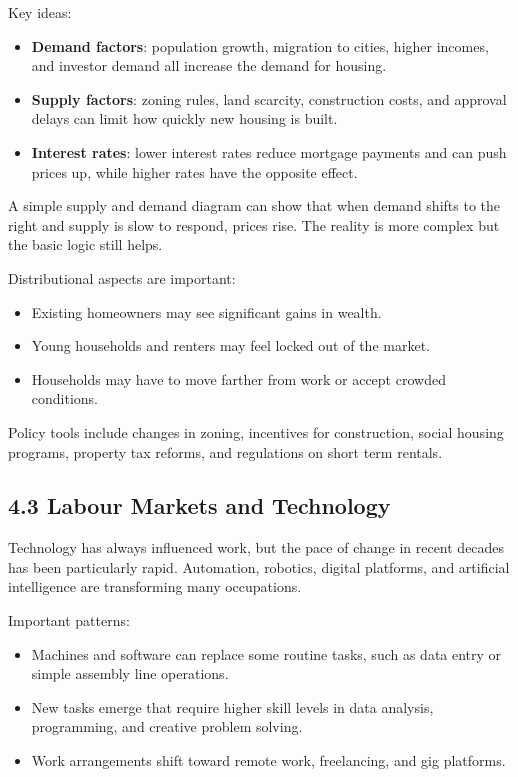 \documentclass[12pt]{article}
\begin{document}
Key ideas:

\begin{itemize}[noitemsep]
    \item \textbf{Demand factors}: population growth, migration to cities, higher incomes, and investor demand all increase the demand for housing.
    \item \textbf{Supply factors}: zoning rules, land scarcity, construction costs, and approval delays can limit how quickly new housing is built.
    \item \textbf{Interest rates}: lower interest rates reduce mortgage payments and can push prices up, while higher rates have the opposite effect.
\end{itemize}

A simple supply and demand diagram can show that when demand shifts to the right and supply is slow to respond, prices rise. The reality is more complex but the basic logic still helps.

Distributional aspects are important:

\begin{itemize}[noitemsep]
    \item Existing homeowners may see significant gains in wealth.
    \item Young households and renters may feel locked out of the market.
    \item Households may have to move farther from work or accept crowded conditions.
\end{itemize}

Policy tools include changes in zoning, incentives for construction, social housing programs, property tax reforms, and regulations on short term rentals.

\subsection*{4.3 Labour Markets and Technology}

Technology has always influenced work, but the pace of change in recent decades has been particularly rapid. Automation, robotics, digital platforms, and artificial intelligence are transforming many occupations.

Important patterns:

\begin{itemize}[noitemsep]
    \item Machines and software can replace some routine tasks, such as data entry or simple assembly line operations.
    \item New tasks emerge that require higher skill levels in data analysis, programming, and creative problem solving.
    \item Work arrangements shift toward remote work, freelancing, and gig platforms.
\end{itemize}
\end{document}
